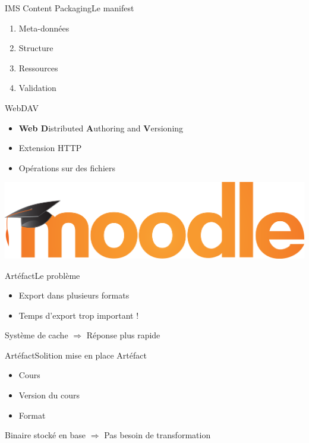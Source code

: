 \documentclass[xcolor=x11names,compress]{beamer}
\renewcommand{\(}{\begin{columns}}
\renewcommand{\)}{\end{columns}}
\newcommand{\<}[1]{\begin{column}{#1}}
\renewcommand{\>}{\end{column}}
\begin{document}
\begin{frame}{IMS Content Packaging}{Le manifest}
  \begin{enumerate}
	\item Meta-données
	  \pause
	\item Structure
	  \pause
	\item Ressources
	  \pause
	\item Validation
  \end{enumerate}
\end{frame}

\begin{frame}{WebDAV}
  \begin{itemize}
	\item {\bf Web D}istributed {\bf A}uthoring and {\bf V}ersioning
	\item Extension HTTP
	\item Opérations sur des fichiers
  \end{itemize}
  \pause
  \vfill
  \begin{center}
	\includegraphics[scale=0.5]{images/moodle}
  \end{center}
  \vfill
\end{frame}

\begin{frame}{Artéfact}{Le problème}
  \begin{itemize}
	\item Export dans plusieurs formats
	\item Temps d'export trop important !
  \end{itemize}
  \vfill
  \begin{center}
	Système de cache $\Rightarrow$ Réponse plus rapide
  \end{center}
  \vfill
\end{frame}

\begin{frame}{Artéfact}{Solition mise en place}
  Artéfact
  \begin{itemize}
	\item Cours
	\item Version du cours
	\item Format
  \end{itemize}
  \vfill
  \begin{center}
	Binaire stocké en base $\Rightarrow$ Pas besoin de transformation
  \end{center}
  \vfill
\end{frame}
\end{document}
